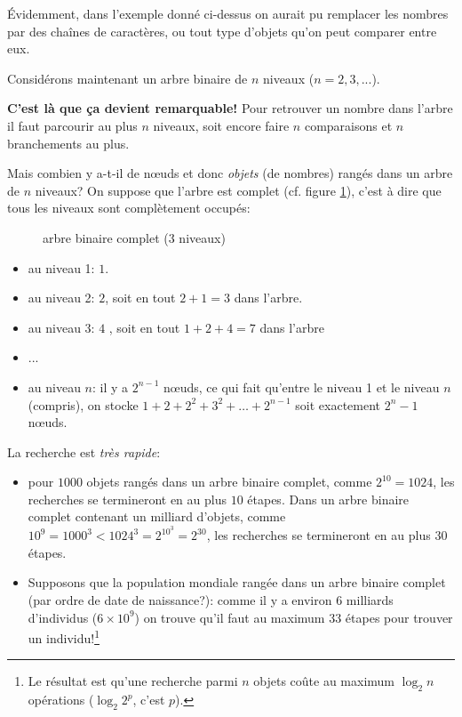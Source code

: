 Évidemment, dans l'exemple donné ci-dessus on aurait pu remplacer les
nombres par des chaînes de caractères, ou tout type d'objets qu'on
peut comparer entre eux.

Considérons maintenant un arbre binaire de $n$ niveaux ($n =
2,3,...$).

\textbf{ C'est là que ça devient remarquable!}
Pour retrouver un nombre dans l'arbre il faut parcourir au plus $n$
niveaux, soit encore faire $n$ comparaisons et $n$ branchements au
plus.

Mais combien y a-t-il de  n{\oe}uds et donc \emph{objets} (de nombres)
  rangés dans un 
arbre de $n$ niveaux? On suppose que l'arbre est complet (cf. figure
\ref{gcomplet}), c'est à dire que tous les niveaux sont complètement occupés:
\begin{figure}
\caption{arbre binaire complet (3 niveaux)}\label{gcomplet}
\end{figure}

\begin{itemize}
\item au niveau 1: $1$.
\item au niveau 2: $2$, soit en tout $2+1 =3$ dans l'arbre.
\item au niveau 3: $4$ , soit en tout $1+ 2 +4 = 7$ dans l'arbre
\item ...
\item au niveau $n$: il y a $2^{n-1}$ n{\oe}uds, ce qui fait qu'entre
  le niveau 1 et le niveau $n$ (compris), on stocke
  $1 +2 + 2^2 + 3^2+ \ldots+ 2^{n-1}$ soit   exactement $2^n - 1$ n{\oe}uds.
\end{itemize}

La recherche est \emph{très rapide}:
\begin{itemize}
  \item pour $1000$ objets rangés dans un arbre binaire complet, comme
    $2^{10} =1024$, les recherches se termineront en au plus $10$
    étapes. Dans un arbre binaire complet contenant un milliard d'objets,
    comme  $10^9 = 1000^3 < 1024^3 = 2^{10^3} = 2^{30}$, les 
    recherches se termineront en au plus $30$ étapes. 
  \item Supposons que la population mondiale rangée dans un arbre
    binaire complet (par ordre de date de naissance?): comme il y a
    environ 6 milliards d'individus  ($6 \times 10^9$) on trouve qu'il faut
    au maximum 33 étapes pour trouver un individu!\footnote{Le
      résultat est qu'une recherche parmi $n$ objets coûte au maximum
      $\log_2 n$ opérations ($\log_2 2^p$, c'est $p$).}
\end{itemize}
